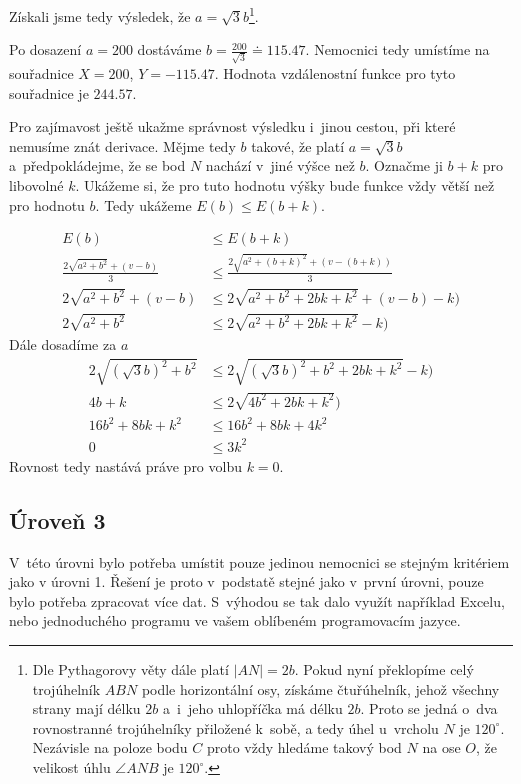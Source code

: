 \documentclass[12pt,a4paper]{article}
\begin{document}
Získali jsme tedy výsledek, že $a = \sqrt{3}b$\footnote{Dle Pythagorovy věty dále platí
$|AN|=2b$. Pokud nyní překlopíme celý trojúhelník $ABN$ podle horizontální osy,
získáme čtuřúhelník, jehož všechny strany mají délku $2b$ a~i~jeho uhlopříčka má délku $2b$. Proto se jedná o~dva rovnostranné trojúhelníky přiložené k~sobě, a tedy úhel u~vrcholu $N$ je $120^\circ$.
Nezávisle na poloze bodu $C$ proto vždy hledáme takový bod $N$ na ose $O$, že velikost úhlu $\angle ANB$ je $120^\circ$.}.

Po dosazení $a = 200$ dostáváme $b = \frac{200}{\sqrt{3}}
\doteq 115.47$. Nemocnici tedy umístíme na souřadnice $X = 200$, $Y = -115.47$.
Hodnota vzdálenostní funkce pro tyto souřadnice je $244.57$.

Pro zajímavost ještě ukažme správnost výsledku i~jinou cestou, při které nemusíme znát derivace. Mějme tedy $b$ takové, že platí $a = \sqrt{3}b$ a~předpokládejme, že se bod $N$ nachází v~jiné výšce než $b$.
Označme ji $b+k$ pro libovolné $k$. Ukážeme si, že pro tuto hodnotu výšky bude funkce vždy větší než pro hodnotu $b$. Tedy ukážeme $E(b) \leq E(b+k)$.

\begin{align}
	E(b) &\leq E(b+k) \nonumber \\
	\frac{2 \sqrt{a^2+b^2} + (v - b)}{3} &\leq \frac{2 \sqrt{a^2+(b+k)^2} + (v - (b+k))}{3} \nonumber \\
	2 \sqrt{a^2+b^2} + (v - b) &\leq 2 \sqrt{a^2+b^2+2bk+k^2} + (v - b) - k) \nonumber \\
	2 \sqrt{a^2+b^2} &\leq 2 \sqrt{a^2+b^2+2bk+k^2} - k) \nonumber
\end{align}
	Dále dosadíme za $a$
\begin{align}
	2 \sqrt{(\sqrt{3}b)^2+b^2} &\leq 2 \sqrt{(\sqrt{3}b)^2+b^2+2bk+k^2} - k) \nonumber \\
	4b + k &\leq 2 \sqrt{4b^2+2bk+k^2}) \nonumber \\
	16b^2 + 8bk + k^2 &\leq 16b^2+8bk+4k^2 \nonumber \\
	0 &\leq 3k^2 \nonumber
\end{align}
Rovnost tedy nastává práve pro volbu $k=0$.


\subsection*{Úroveň 3}
V~této úrovni bylo potřeba umístit pouze jedinou nemocnici se stejným kritériem
jako v úrovni 1. Řešení je proto v~podstatě stejné jako v~první úrovni, pouze
bylo potřeba zpracovat více dat. S~výhodou se tak dalo využít například Excelu,
nebo jednoduchého programu ve vašem oblíbeném programovacím jazyce.
\end{document}
